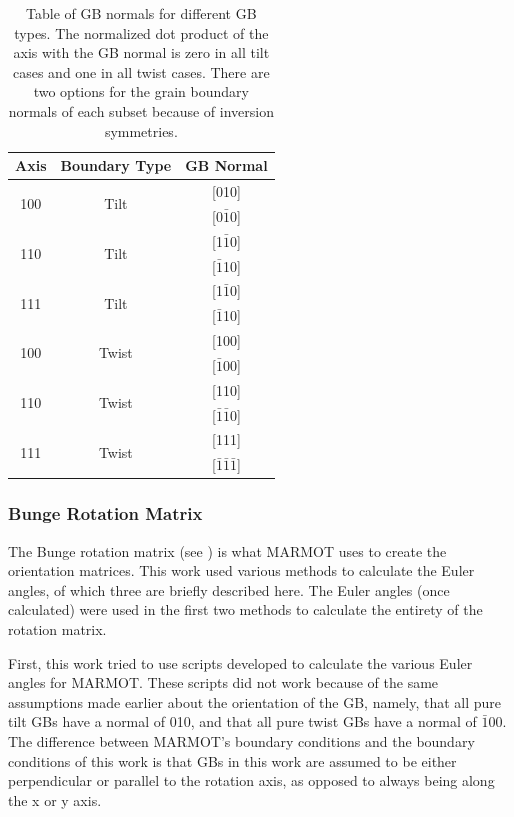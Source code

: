 \documentclass[twoside,senior]{BYUPhys}
\begin{document}
\begin{table}[ht!]
\centering
\caption{\label{table:geometricgbnorms}Table of GB normals for different GB types. The normalized dot product of the axis with the GB normal is zero in all tilt cases and one in all twist cases.  There are two options for the grain boundary normals of each subset because of inversion symmetries.}

\begin{tabular}{ccc}
Axis & Boundary Type & GB Normal \\
\hline
\hline
\multirow{2}{*}{\textlangle{}100\textrangle{}} & \multirow{2}{*}{Tilt} & [010] \\
                              & & [0$\bar{1}$0] \\
\hline
\multirow{2}{*}{\textlangle{}110\textrangle{}} & \multirow{2}{*}{Tilt} & [1$\bar{1}$0] \\
							  & & [$\bar{1}$10] \\
\hline
\multirow{2}{*}{\textlangle{}111\textrangle{}} & \multirow{2}{*}{Tilt} & [1$\bar{1}$0] \\
							  & & [$\bar{1}$10] \\
\hline
\multirow{2}{*}{\textlangle{}100\textrangle{}} & \multirow{2}{*}{Twist} & [100] \\
							  & & [$\bar{1}$00] \\
\hline
\multirow{2}{*}{\textlangle{}110\textrangle{}} & \multirow{2}{*}{Twist} & [110] \\
							  & & [$\bar{1}\bar{1}$0] \\
\hline
\multirow{2}{*}{\textlangle{}111\textrangle{}} & \multirow{2}{*}{Twist} & [111] \\
							  & & [$\bar{1}\bar{1}\bar{1}$] \\
\hline
\hline
\end{tabular}
\end{table}

\subsubsection{Bunge Rotation Matrix\label{PQ:BungeMat}}
The Bunge rotation matrix (see ) is what MARMOT uses to create the orientation matrices.  This work used various methods to calculate the Euler angles, of which three are briefly described here. The Euler angles (once calculated) were used in the first two methods to calculate the entirety of the rotation matrix.

First, this work tried to use scripts developed to calculate the various Euler angles for MARMOT.  These scripts did not work because of the same assumptions made earlier about the orientation of the GB, namely, that all pure tilt GBs have a normal of 010, and that all pure twist GBs have a normal of $\bar{1}$00.  The difference between MARMOT's boundary conditions and the boundary conditions of this work is that GBs in this work are assumed to be either perpendicular or parallel to the rotation axis, as opposed to always being along the x or y axis.
\end{document}

